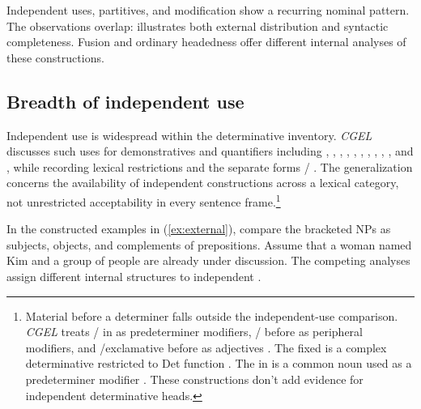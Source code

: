 \documentclass[12pt]{article}
\begin{document}
Independent uses, partitives, and modification show a recurring nominal pattern. The observations overlap:  illustrates both external distribution and syntactic completeness. Fusion and ordinary headedness offer different internal analyses of these constructions.

\subsection{Breadth of independent use}\label{sec:independent}

Independent use is widespread within the determinative inventory. \textit{CGEL} discusses such uses for demonstratives and quantifiers including , , , , , , , , , , and , while recording lexical restrictions and the separate forms / \citep[371--372, 410--424]{huddleston2002}. The generalization concerns the availability of independent constructions across a lexical category, not unrestricted acceptability in every sentence frame.\footnote{Material before a determiner falls outside the independent-use comparison. \textit{CGEL} treats / in  as predeterminer modifiers, / before  as peripheral modifiers, and /exclamative  before  as adjectives \citep[433--437]{huddleston2002}. The fixed  is a complex determinative restricted to Det function \citep[394]{huddleston2002}. The  in  is a common noun used as a predeterminer modifier \citep[434]{huddleston2002}. These constructions don't add evidence for independent determinative heads.}

In the constructed examples in (\ref{ex:external}), compare the bracketed NPs as subjects, objects, and complements of prepositions. Assume that a woman named Kim and a group of people are already under discussion. The competing analyses assign different internal structures to independent .

\begin{samepage}
\ea\label{ex:external}
\ea {}\qquad {}\qquad {}
\ex {}\qquad {}\qquad {}
\ex {}\qquad {}\qquad {}
\ex {}\qquad {}\qquad {}
\z\z
\end{samepage}
\end{document}
